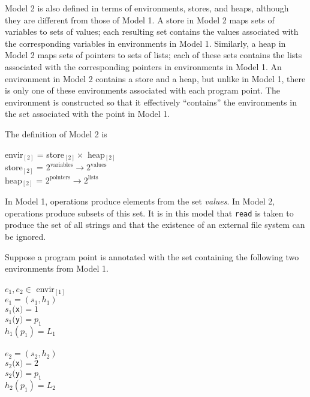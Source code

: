 Model 2 is also defined in terms of environments, stores, and heaps,
although they are different from those of Model 1.  A store in Model 2
maps sets of variables to sets of values; each resulting set contains
the values associated with the corresponding variables in environments
in Model 1. Similarly, a heap in Model 2 maps sets of pointers to sets
of lists; each of these sets contains the lists associated with the
corresponding pointers in environments in Model 1. An environment in
Model 2 contains a store and a heap, but unlike in Model 1, there is
only one of these environments associated with each program point. The
environment is constructed so that it effectively ``contains'' the
environments in the set associated with the point in Model 1.

The definition of Model 2 is 


\goodbreak
\begin{specialcode}{}
\>envir$_{[2]}$  =  store$_{[2]} \times $ heap$_{[2]}$\\
\>store$_{[2]}$  =  $2^{\textrm{variables}} \rightarrow 2^{\textrm{values}}$ \\
\>heap$_{[2]}$   =  $2^{\textrm{pointers}} \rightarrow 2^{\textrm{lists}}$ \\
\end{specialcode}

In Model 1, operations produce elements from the set
\textit{values}. In Model 2, operations produce subsets of this
set. It is in this model that \texttt{read} is taken to produce the
set of all strings and that the existence of an external file system
can be ignored.

Suppose a program point is annotated with the set containing the
following two environments from Model 1.

\goodbreak
\begin{iconcode}
\> $e_1,e_2 \in$ envir$_{[1]}$\\
\> $e_1 = (s_1, h_1)$\\
\> $s_1($\texttt{x}$) = 1$\\
\> $s_1($\texttt{y}$) = p_1$\\
\> $h_1(p_1) = L_1$\\
\\
\> $e_2 = (s_2, h_2)$\\
\> $s_2($\texttt{x}$) = 2$\\
\> $s_2($\texttt{y}$) = p_1$\\
\> $h_2(p_1) = L_2$\\
\end{iconcode}

